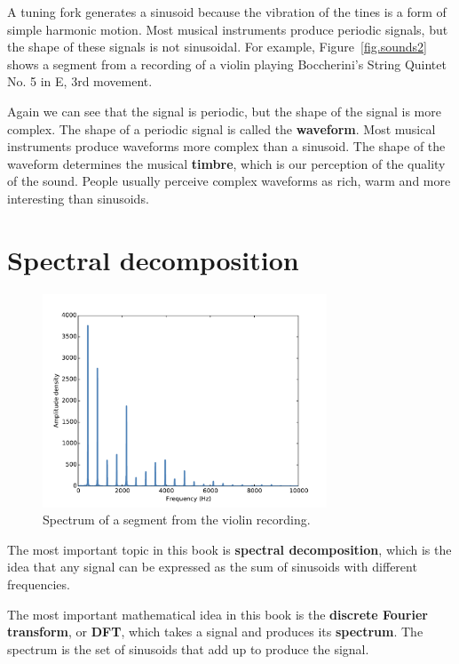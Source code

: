 \documentclass[12pt]{book}
\begin{document}
A tuning fork generates a sinusoid because the vibration of the tines
is a form of simple harmonic motion.  Most musical instruments
produce periodic signals, but the shape of these signals is not
sinusoidal.  For example, Figure~\ref{fig.sounds2} shows a segment
from a recording of a violin playing
Boccherini's String Quintet No. 5 in E, 3rd
movement.


Again we can see that the signal is periodic, but the shape of the
signal is more complex.  The shape of a periodic signal is called
the {\bf waveform}.  Most musical instruments produce waveforms more
complex than a sinusoid.  The shape of the waveform determines the
musical {\bf timbre}, which is our perception of the quality of the
sound.  People usually perceive complex waveforms as rich, warm and
more interesting than sinusoids.


\section{Spectral decomposition}

\begin{figure}
\centerline{\includegraphics[height=2.5in]{figs/sounds3.pdf}}
\caption{Spectrum of a segment from the violin recording.}
\label{fig.sounds3}
\end{figure}

The most important topic in this book is {\bf spectral decomposition},
which is the idea that any signal can be expressed as the sum of
sinusoids with different frequencies.

The most important mathematical idea in this book is the {\bf discrete
  Fourier transform}, or {\bf DFT}, which takes a signal and produces
its {\bf spectrum}.  The spectrum is the set of sinusoids that add up to
produce the signal.
\end{document}
